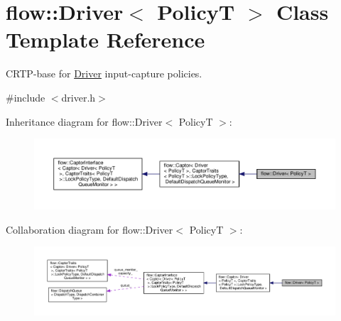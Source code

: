 \hypertarget{classflow_1_1_driver}{}\section{flow\+:\+:Driver$<$ PolicyT $>$ Class Template Reference}
\label{classflow_1_1_driver}


C\+R\+T\+P-\/base for \hyperlink{classflow_1_1_driver}{Driver} input-\/capture policies.  




{\ttfamily \#include $<$driver.\+h$>$}



Inheritance diagram for flow\+:\+:Driver$<$ PolicyT $>$\+:
\nopagebreak
\begin{figure}[H]
\begin{center}
\leavevmode
\includegraphics[width=350pt]{classflow_1_1_driver__inherit__graph}
\end{center}
\end{figure}


Collaboration diagram for flow\+:\+:Driver$<$ PolicyT $>$\+:
\nopagebreak
\begin{figure}[H]
\begin{center}
\leavevmode
\includegraphics[width=350pt]{classflow_1_1_driver__coll__graph}
\end{center}
\end{figure}

